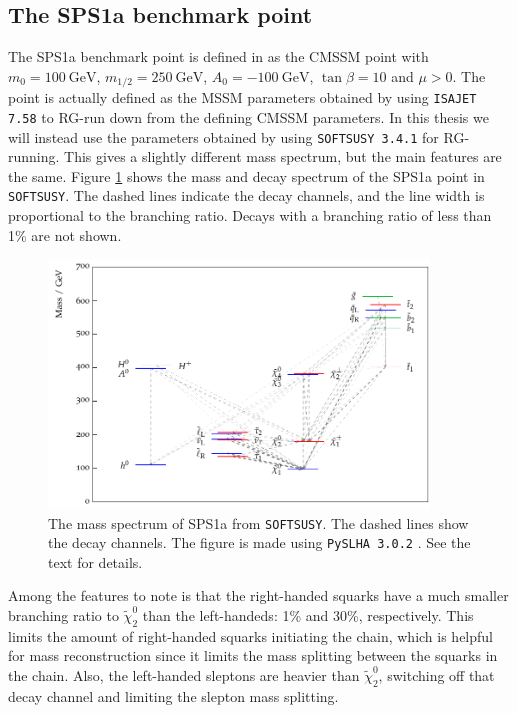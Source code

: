 \documentclass[twoside,english]{uiofysmaster}
\begin{document}
\subsection{The SPS1a benchmark point}
\label{sec:sps1a_benchmark_point}%
The SPS1a benchmark point is defined in \cite{Allanach:2002nj} as the CMSSM point with $m_0=100~\mathrm{GeV}$, $m_{1/2}=250~\mathrm{GeV}$, $A_0=-100~\mathrm{GeV}$, $\tan \beta = 10$ and $\mu > 0$. The point is actually defined as the MSSM parameters obtained by using {\tt ISAJET 7.58} \cite{Baer:1999sp} to RG-run down from the defining CMSSM parameters. In this thesis we will instead use the parameters obtained by using {\tt SOFTSUSY 3.4.1} \cite{Allanach:2001kg} for RG-running. This gives a slightly different mass spectrum, but the main features are the same. Figure \ref{fig:SPS1a_softsusy_spectrum} shows the mass and decay spectrum of the SPS1a point in {\tt SOFTSUSY}. The dashed lines indicate the decay channels, and the line width is proportional to the branching ratio. Decays with a branching ratio of less than 1\% are not shown.
\begin{figure}[hbt]
  \includegraphics[width=0.9\textwidth]{figures/susyintro/softsusy_sps1a_with_branchings_original.pdf}
  \caption{The mass spectrum of SPS1a from {\tt SOFTSUSY}. The dashed lines show the decay channels. The figure is made using {\tt PySLHA 3.0.2} \cite{Buckley:2013jua}. See the text for details.}
  \label{fig:SPS1a_softsusy_spectrum}
\end{figure}
Among the features to note is that the right-handed squarks have a much smaller branching ratio to $\tilde \chi_2^0$ than the left-handeds: 1\% and 30\%, respectively. This limits the amount of right-handed squarks initiating the chain, which is helpful for mass reconstruction since it limits the mass splitting between the squarks in the chain. Also, the left-handed sleptons are heavier than $\tilde \chi_2^0$, switching off that decay channel and limiting the slepton mass splitting. 
\end{document}
